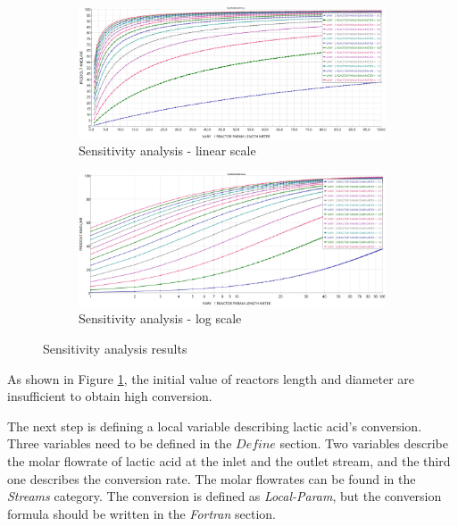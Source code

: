 \begin{figure}[h!]
	\centering
	\begin{subfigure}[b]{0.99\textwidth}
		\centering
		\includegraphics[width=\textwidth]{Figures/Proces_Analysis/Parametric_sensitivity_analysis.jpg}
		\caption{Sensitivity analysis - linear scale}
	\end{subfigure}
	\begin{subfigure}[b]{0.99\textwidth}
		\centering
		\includegraphics[width=\textwidth]{Figures/Proces_Analysis/Parametric_sensitivity_analysis_inverse.jpg}
		\caption{Sensitivity analysis - log scale}
	\end{subfigure}
	\caption{Sensitivity analysis results}
	\label{fig:Ester_Sensitivity_Analysis}
\end{figure}

As shown in Figure \ref{fig:Ester_Sensitivity_Analysis}, the initial value of reactors length and diameter are insufficient to obtain high conversion.

The next step is defining a local variable describing lactic acid's conversion. Three variables need to be defined in the $Define$ section. Two variables describe the molar flowrate of lactic acid at the inlet and the outlet stream, and the third one describes the conversion rate. The molar flowrates can be found in the \textit{Streams} category. The conversion is defined as \textit{Local-Param}, but the conversion formula should be written in the \textit{Fortran} section. 

